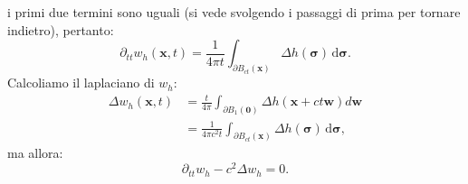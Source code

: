 \documentclass[10pt,a4paper,twoside,openright]{book}
\newcommand{\x}{\mathbf{x}}
\newcommand{\zer}{\mathbf{0}}
\newcommand{\sigg}{\bm{\sigma}}
\newcommand{\de}{\,\mathrm d}
\newcommand{\dsig}{\de \sigg}
\begin{document}
\begin{dimostrazione}
\begin{equation*}
	\end{equation*}
	i primi due termini sono uguali (si vede svolgendo i passaggi di prima per tornare indietro), pertanto:
	\begin{equation*}
		\partial _{tt} w_{h}(\x ,t) =\frac{1}{4\pi t}\int _{\partial B_{ct}(\x)} \Delta h(\sigg) \dsig .
	\end{equation*}
	Calcoliamo il laplaciano di $\displaystyle w_{h}$:
	\begin{align*}
		\Delta w_{h}(\x ,t) & =\frac{t}{4\pi }\int _{\partial B_{1}(\zer)} \Delta h(\x +ct\mathbf{w}) d\mathbf{w} \\
		                            & =\frac{1}{4\pi c^{2} t}\int _{\partial B_{ct}(\x)} \Delta h(\sigg) \dsig , 
	\end{align*}
	ma allora:
	\begin{equation*}
		\partial _{tt} w_{h} -c^{2} \Delta w_{h} =0.
	\end{equation*}
\end{dimostrazione}
\end{document}
